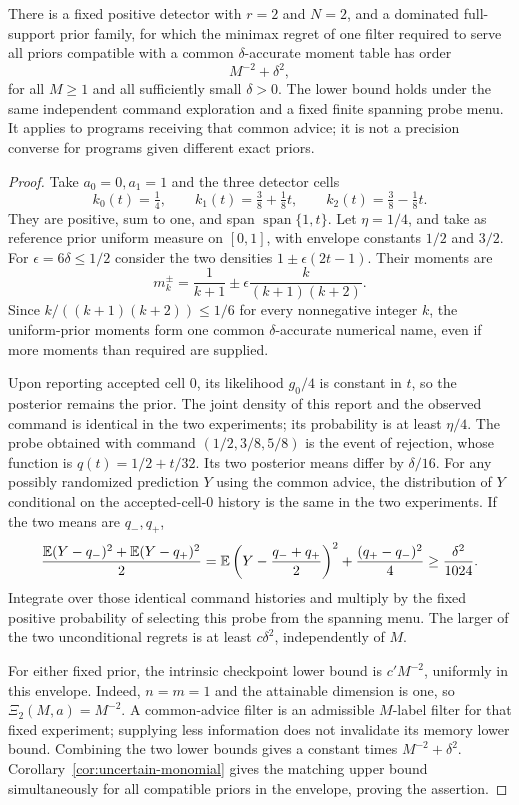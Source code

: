 \begin{proposition}
\label{prop:advice-floor}
There is a fixed positive detector with $r=2$ and $N=2$, and a dominated
full-support prior family, for which the minimax regret of one filter
required to serve all priors compatible with a common $\delta$-accurate
moment table has order
\[
 M^{-2}+\delta^2,
\]
for all $M\ge1$ and all sufficiently small $\delta>0$. The lower bound
holds under the same independent command exploration and a fixed finite
spanning probe menu. It applies to programs receiving that common advice;
it is not a precision converse for programs given different exact priors.
\end{proposition}
\begin{proof}
Take $a_0=0,a_1=1$ and the three detector cells
\[
 k_0(t)=\tfrac14,\qquad k_1(t)=\tfrac38+\tfrac18t,
 \qquad k_2(t)=\tfrac38-\tfrac18t.
\]
They are positive, sum to one, and span $\operatorname{span}\{1,t\}$.
Let $\eta=1/4$, and take as reference prior uniform measure on $[0,1]$,
with envelope constants $1/2$ and $3/2$. For
$\epsilon=6\delta\le1/2$ consider the two densities
$1\pm\epsilon(2t-1)$. Their moments are
\[
 m_k^\pm=\frac1{k+1}\pm\epsilon\frac{k}{(k+1)(k+2)}.
\]
Since $k/((k+1)(k+2))\le1/6$ for every nonnegative integer $k$,
the uniform-prior moments form one common $\delta$-accurate numerical
name, even if more moments than required are supplied.

Upon reporting accepted cell $0$, its likelihood $g_0/4$ is constant
in $t$, so the posterior remains the prior. The joint density of this
report and the observed command is identical in the two experiments;
its probability is at least $\eta/4$. The probe obtained with command
$(1/2,3/8,5/8)$ is the event of rejection, whose function is
$q(t)=1/2+t/32$. Its two posterior means differ by $\delta/16$.
For any possibly randomized prediction $Y$ using the common advice,
the distribution of $Y$ conditional on the accepted-cell-$0$ history
is the same in the two experiments. If the two means are $q_-,q_+$,
\[
 \frac{\mathbb E(Y-q_-)^2+\mathbb E(Y-q_+)^2}{2}
 =\mathbb E\left(Y-\frac{q_-+q_+}{2}\right)^2
       +\frac{(q_+-q_-)^2}{4}
 \ge\frac{\delta^2}{1024}.
\]
Integrate over those identical command histories and multiply by the
fixed positive probability of selecting this probe from the spanning
menu. The larger of the two unconditional regrets is at least
$c\delta^2$, independently of $M$.

For either fixed prior, the intrinsic checkpoint lower bound is
$c'M^{-2}$, uniformly in this envelope. Indeed, $n=m=1$ and the
attainable dimension is one, so $\Xi_2(M,a)=M^{-2}$.
A common-advice filter is an admissible $M$-label filter for that fixed
experiment; supplying less information does not invalidate its memory
lower bound. Combining the two lower bounds gives a constant times
$M^{-2}+\delta^2$. Corollary~\ref{cor:uncertain-monomial} gives the
matching upper bound simultaneously for all compatible priors in the
envelope, proving the assertion.
\end{proof}

